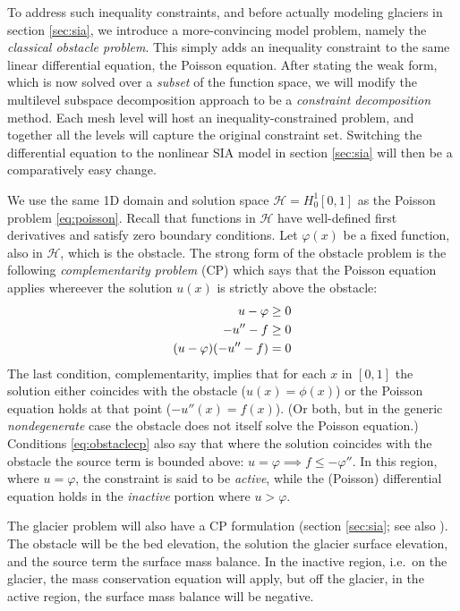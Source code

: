 \documentclass[letterpaper,final,12pt,reqno]{amsart}
\theoremstyle{claim}
\numberwithin{equation}{section}
\numberwithin{figure}{section}
\numberwithin{table}{section}
\begin{document}
To address such inequality constraints, and before actually modeling glaciers in section \ref{sec:sia}, we introduce a more-convincing model problem, namely the \emph{classical obstacle problem}.  This simply adds an inequality constraint to the same linear differential equation, the Poisson equation.  After stating the weak form, which is now solved over a \emph{subset} of the function space, we will modify the multilevel subspace decomposition approach to be a \emph{constraint decomposition} method.  Each mesh level will host an inequality-constrained problem, and together all the levels will capture the original constraint set.  Switching the differential equation to the nonlinear SIA model in section \ref{sec:sia} will then be a comparatively easy change.

We use the same 1D domain and solution space $\mathcal{H}=H_0^1[0,1]$ as the Poisson problem \eqref{eq:poisson}.  Recall that functions in $\mathcal{H}$ have well-defined first derivatives and satisfy zero boundary conditions.  Let $\varphi(x)$ be a fixed function, also in $\mathcal{H}$, which is the obstacle.  The strong form of the obstacle problem is the following \emph{complementarity problem} (CP) \cite{Bueler2021,KinderlehrerStampacchia1980} which says that the Poisson equation applies whereever the solution $u(x)$ is strictly above the obstacle:
\begin{align}
  u - \varphi &\ge 0 \label{eq:obstaclecp} \\
  -u''-f &\ge 0 \notag \\
  (u-\varphi)(-u''-f) &= 0 \notag
\end{align}
The last condition, complementarity, implies that for each $x$ in $[0,1]$ the solution either coincides with the obstacle ($u(x)=\phi(x)$) or the Poisson equation holds at that point ($-u''(x)=f(x)$).  (Or both, but in the generic \emph{nondegenerate} \cite{KinderlehrerStampacchia1980} case the obstacle does not itself solve the Poisson equation.)  Conditions \eqref{eq:obstaclecp} also say that where the solution coincides with the obstacle the source term is bounded above: $u=\varphi \implies f \le -\varphi''$.  In this region, where $u=\varphi$, the constraint is said to be \emph{active}, while the (Poisson) differential equation holds in the \emph{inactive} portion where $u>\varphi$.

The glacier problem will also have a CP formulation (section \ref{sec:sia}; see also \cite{Calvoetal2002}).  The obstacle will be the bed elevation, the solution the glacier surface elevation, and the source term the surface mass balance.  In the inactive region, i.e.~on the glacier, the mass conservation equation will apply, but off the glacier, in the active region, the surface mass balance will be negative.
\end{document}

